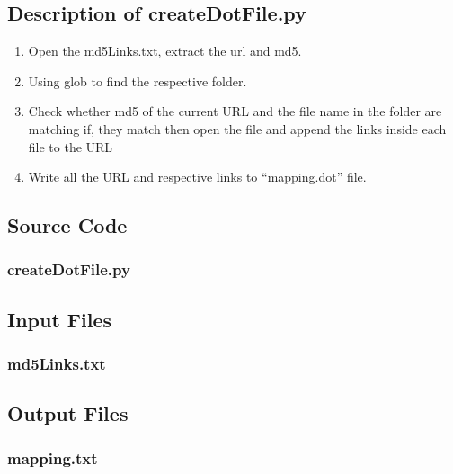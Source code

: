 \documentclass[12pt]{article}
\begin{document}
\subsection{Description of createDotFile.py}
\begin{enumerate}
	\item Open the md5Links.txt, extract the url and md5.
	\item Using glob to find the respective folder.	
	\item Check whether md5 of the current URL and the file name in the folder are matching if, they match then open the file and append the links inside each file to the URL
	\item Write all the URL and respective links to ``mapping.dot'' file.	
\end{enumerate}

\newpage
\subsection{Source Code}
\subsubsection{createDotFile.py}

\newpage
\subsection{Input Files}
\subsubsection{md5Links.txt}

\newpage
\subsection{Output Files}
\subsubsection{mapping.txt}

\newpage

\end{document}
